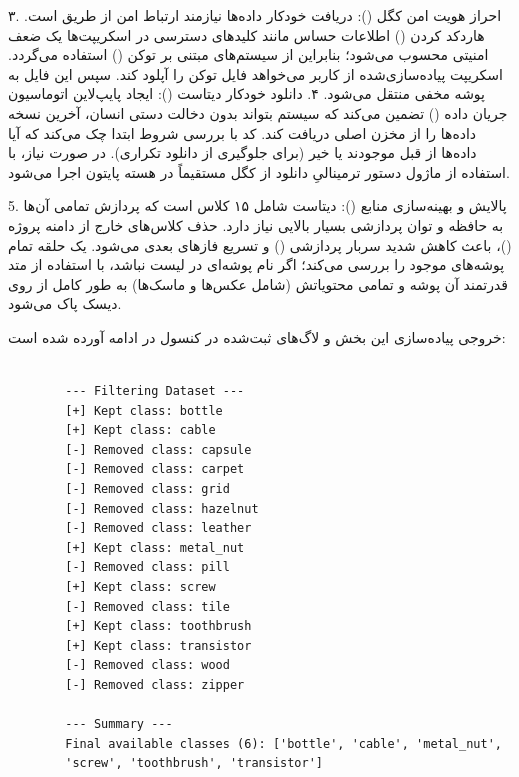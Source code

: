 \documentclass{article}
\begin{document}
\vspace{0.3cm}
۳. احراز هویت امن کگل ():
دریافت خودکار داده‌ها نیازمند ارتباط امن از طریق  است. هاردکد کردن () اطلاعات حساس مانند کلیدهای دسترسی در اسکریپت‌ها یک ضعف امنیتی محسوب می‌شود؛ بنابراین از سیستم‌های مبتنی بر توکن () استفاده می‌گردد. اسکریپت پیاده‌سازی‌شده از کاربر می‌خواهد فایل توکن  را آپلود کند. سپس این فایل به پوشه مخفی  منتقل می‌شود.
\vspace{0.3cm}
۴. دانلود خودکار دیتاست ():
ایجاد پایپ‌لاین اتوماسیون جریان داده () تضمین می‌کند که سیستم بتواند بدون دخالت دستی انسان، آخرین نسخه داده‌ها را از مخزن اصلی دریافت کند. کد با بررسی شروط  ابتدا چک می‌کند که آیا داده‌ها از قبل موجودند یا خیر (برای جلوگیری از دانلود تکراری). در صورت نیاز، با استفاده از ماژول  دستور ترمینالیِ دانلود از کگل مستقیماً در هسته پایتون اجرا می‌شود.


\vspace{0.3cm}
5. پالایش و بهینه‌سازی منابع ():
دیتاست  شامل ۱۵ کلاس است که پردازش تمامی آن‌ها به حافظه و توان پردازشی بسیار بالایی نیاز دارد. حذف کلاس‌های خارج از دامنه پروژه ()، باعث کاهش شدید سربار پردازشی () و تسریع فازهای بعدی می‌شود. یک حلقه  تمام پوشه‌های موجود را بررسی می‌کند؛ اگر نام پوشه‌ای در لیست  نباشد، با استفاده از متد قدرتمند  آن پوشه و تمامی محتویاتش (شامل عکس‌ها و ماسک‌ها) به طور کامل از روی دیسک پاک می‌شود.

خروجی پیاده‌سازی این بخش و لاگ‌های ثبت‌شده در کنسول در ادامه آورده شده است:

\begin{tcolorbox}[colback=Tan!15, colframe=MidnightBlue, title=خروجی لاگ اجرایی پالایش دیتاست در پایتون]
	\begin{latin}
		\begin{verbatim}
		
		--- Filtering Dataset ---
		[+] Kept class: bottle
		[+] Kept class: cable
		[-] Removed class: capsule
		[-] Removed class: carpet
		[-] Removed class: grid
		[-] Removed class: hazelnut
		[-] Removed class: leather
		[+] Kept class: metal_nut
		[-] Removed class: pill
		[+] Kept class: screw
		[-] Removed class: tile
		[+] Kept class: toothbrush
		[+] Kept class: transistor
		[-] Removed class: wood
		[-] Removed class: zipper
		
		--- Summary ---
		Final available classes (6): ['bottle', 'cable', 'metal_nut',
		'screw', 'toothbrush', 'transistor']
		\end{verbatim}
	\end{latin}
\end{tcolorbox}
\end{document}
